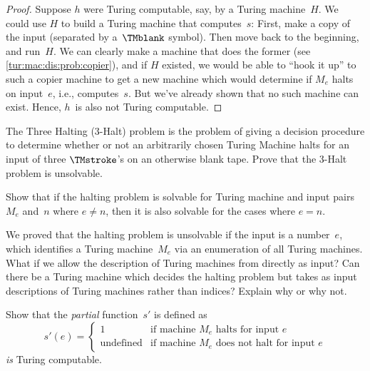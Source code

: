 \documentclass[../../../include/open-logic-section]{subfiles}
\begin{document}
\begin{proof}
Suppose $h$ were Turing computable, say, by a Turing machine~$H$. We
could use $H$ to build a Turing machine that computes~$s$: First, make
a copy of the input (separated by a~$\TMblank$ symbol). Then move back
to the beginning, and run~$H$.  We can clearly make a machine that
does the former (see \cref{tur:mac:dis:prob:copier}), and if $H$
existed, we would be able to ``hook it up'' to such a copier machine
to get a new machine which would determine if $M_e$ halts on
input~$e$, i.e., computes~$s$. But we've already shown that no such
machine can exist. Hence, $h$~is also not Turing computable.
\end{proof}

\begin{prob}
The Three Halting (3-Halt) problem is the problem of giving a decision
procedure to determine whether or not an arbitrarily chosen Turing
Machine halts for an input of three $\TMstroke$'s on an otherwise
blank tape. Prove that the 3-Halt problem is unsolvable.
\end{prob}

\begin{prob}
Show that if the halting problem is solvable for Turing machine and
input pairs $M_e$ and~$n$ where $e \neq n$, then it is also solvable
for the cases where $e = n$.
\end{prob}

\begin{prob}
We proved that the halting problem is unsolvable if the input is a
number~$e$, which identifies a Turing machine~$M_e$ via an enumeration
of all Turing machines.  What if we allow the description of Turing
machines from  directly as input?  Can there
be a Turing machine which decides the halting problem but takes as
input descriptions of Turing machines rather than indices?  Explain
why or why not.
\end{prob}

\begin{prob} Show that the \emph{partial} function~$s'$ is defined as
  \[
  s'(e) =
  \begin{cases}
    \text{1} & \text{if machine~$M_e$ halts for input $e$}\\
    \text{undefined} & \text{if machine~$M_e$ does not halt for input $e$}
  \end{cases}
  \]
  \emph{is} Turing computable.
\end{prob}
\end{document}
